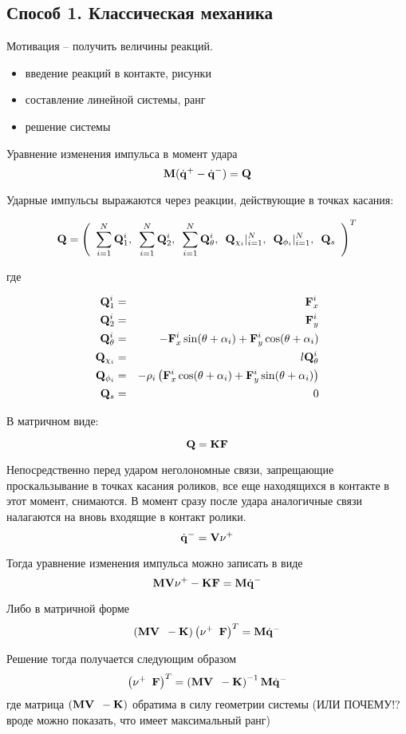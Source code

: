 \subsection{Способ 1. Классическая механика}

Мотивация -- получить величины реакций.

\begin{itemize}
    \item введение реакций в контакте, рисунки
    \item составление линейной системы, ранг
    \item решение системы
\end{itemize}

Уравнение изменения импульса в момент удара
\begin{equation*}
\eqDeltaqQ
\end{equation*}

Ударные импульсы выражаются через реакции, действующие в точках касания:

\begin{equation*}
\eqQ
\end{equation*}

где

\begin{eqnarray*}
\eqQiOne \\
\eqQiTwo \\
\eqQiTheta \\
\eqQChii \\
\eqQPhii \\
\eqQs
\end{eqnarray*}

В матричном виде:

\begin{equation*}
\eqQKF
\end{equation*}

Непосредственно перед ударом неголономные связи, запрещающие проскальзывание в точках касания роликов, все еще находящихся в контакте в этот момент, снимаются.
В момент сразу после удара аналогичные связи налагаются на вновь входящие в контакт ролики.
\begin{equation*}
\eqqnu
\end{equation*}

Тогда уравнение изменения импульса можно записать в виде
\begin{equation*}
\eqMVnuKF
\end{equation*}

Либо в матричной форме
\begin{equation*}
\eqMVnuKFmat
\end{equation*}

Решение тогда получается следующим образом
\begin{equation*}
\eqMVnuKFmatres
\end{equation*}
где матрица $\mvk$ обратима в силу геометрии системы (ИЛИ ПОЧЕМУ!? вроде можно показать, что имеет максимальный ранг)


